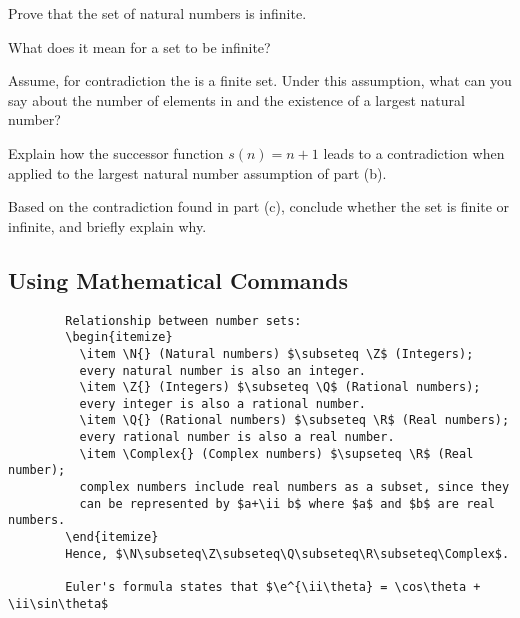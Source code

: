 \documentclass[twoside]{article}
\begin{document}
\begin{center}
\begin{minipage}{0.7\textwidth}
    \begin{question}[4]
  Prove that the set \N{} of natural numbers is infinite.
  
  \qpart
    What does it mean for a set to be infinite?
    
  \qpart
    Assume, for contradiction the \N{} is a finite set. 
    Under this assumption, what can you say about the 
    number of elements in \N{} and the existence of a 
    largest natural number?
    
  \qpart
    Explain how the successor function $s(n) = n + 1$ 
    leads to a contradiction when applied to the largest 
    natural number assumption of part (b).
    
  \qpart
    Based on the contradiction found in part (c), conclude 
    whether the set \N{} is finite or infinite, and briefly 
    explain why.
\end{question}
\end{minipage}
\end{center}

\subsection{Using Mathematical Commands}

\begin{verbatim}
        Relationship between number sets:
        \begin{itemize}
          \item \N{} (Natural numbers) $\subseteq \Z$ (Integers);
          every natural number is also an integer.
          \item \Z{} (Integers) $\subseteq \Q$ (Rational numbers);
          every integer is also a rational number.
          \item \Q{} (Rational numbers) $\subseteq \R$ (Real numbers);
          every rational number is also a real number.
          \item \Complex{} (Complex numbers) $\supseteq \R$ (Real number);
          complex numbers include real numbers as a subset, since they
          can be represented by $a+\ii b$ where $a$ and $b$ are real numbers.
        \end{itemize}
        Hence, $\N\subseteq\Z\subseteq\Q\subseteq\R\subseteq\Complex$.
        
        Euler's formula states that $\e^{\ii\theta} = \cos\theta + \ii\sin\theta$
\end{verbatim}
\end{document}
